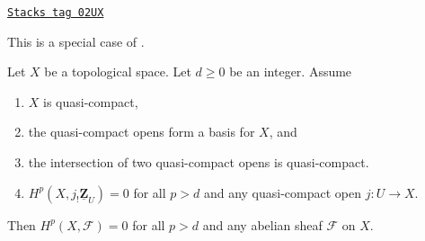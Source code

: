\begin{lemma}
\label{cohomology-lemma-vanishing-generated-one-section}
\href{https://stacks.math.columbia.edu/tag/02UX}{\texttt{Stacks tag 02UX}}

\begin{reference}
This is a special case of \cite[Proposition 3.6.1]{Tohoku}.
\end{reference}
Let $X$ be a topological space. Let $d \geq 0$ be an integer. Assume
\begin{enumerate}
\item $X$ is quasi-compact,
\item the quasi-compact opens form a basis for $X$, and
\item the intersection of two quasi-compact opens is quasi-compact.
\item $H^p(X, j_!\underline{\mathbf{Z}}_U) = 0$ for all $p > d$
and any quasi-compact open $j : U \to X$.
\end{enumerate}
Then $H^p(X, \mathcal{F}) = 0$ for all $p > d$
and any abelian sheaf $\mathcal{F}$ on $X$.
\end{lemma}

